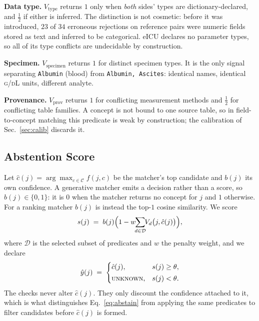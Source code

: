 \noindent\textbf{Data type.}
$V_{\mathrm{type}}$ returns $1$ only when \emph{both} sides' types are
dictionary-declared, and $\tfrac12$ if either is inferred. The distinction is not
cosmetic: before it was introduced, $23$ of $34$ erroneous rejections on reference pairs
were numeric fields stored as text and inferred to be categorical. eICU declares no
parameter types, so all of its type conflicts are undecidable by construction.

\noindent\textbf{Specimen.}
$V_{\mathrm{specimen}}$ returns $1$ for distinct specimen types. It is the only signal
separating \texttt{Albumin} (blood) from \texttt{Albumin, Ascites}: identical names,
identical \textsc{g/dL} units, different analyte.

\noindent\textbf{Provenance.}
$V_{\mathrm{prov}}$ returns $1$ for conflicting measurement methods and $\tfrac12$ for
conflicting table families. A concept is not bound to one source table, so in
field-to-concept matching this predicate is weak by construction; the calibration of
Sec.~\ref{sec:calib} discards it.

\subsection{Abstention Score}

Let $\hat{c}(j)=\arg\max_{c\in\mathcal{C}} f(j,c)$ be the matcher's top candidate and
$b(j)$ its own confidence. A generative matcher emits a decision rather than a score, so
$b(j)\in\{0,1\}$: it is $0$ when the matcher returns no concept for $j$ and $1$
otherwise. For a ranking matcher $b(j)$ is instead the top-$1$ cosine similarity. We
score
\begin{equation}
s(j) \;=\; b(j)\Bigl(1 - w\!\!\sum_{d\in\mathcal{D}}\!\! V_d\bigl(j,\hat{c}(j)\bigr)\Bigr),
\label{eq:abstain}
\end{equation}
where $\mathcal{D}$ is the selected subset of predicates and $w$ the penalty weight, and
we declare
\begin{equation}
\hat{y}(j) \;=\;
\begin{cases}
\hat{c}(j), & s(j) \ge \theta,\\[2pt]
\textsc{unknown}, & s(j) < \theta .
\end{cases}
\label{eq:decide}
\end{equation}
The checks never alter $\hat{c}(j)$. They only discount the confidence attached to it,
which is what distinguishes Eq.~\eqref{eq:abstain} from applying the same predicates to
filter candidates before $\hat{c}(j)$ is formed.

